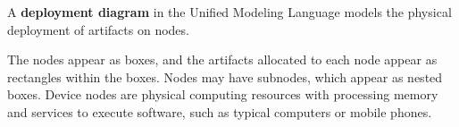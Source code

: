 \documentclass[12pt]{report}
\renewcommand\emph{\textbf}
\begin{document}
                A \emph{deployment diagram} in the Unified Modeling Language models the physical deployment of artifacts on nodes.

                The nodes appear as boxes, and the artifacts allocated to each node appear as rectangles within the boxes. Nodes may have subnodes, which appear as nested boxes. Device nodes are physical computing resources with processing memory and services to execute software, such as typical computers or mobile phones.

\end{document}
